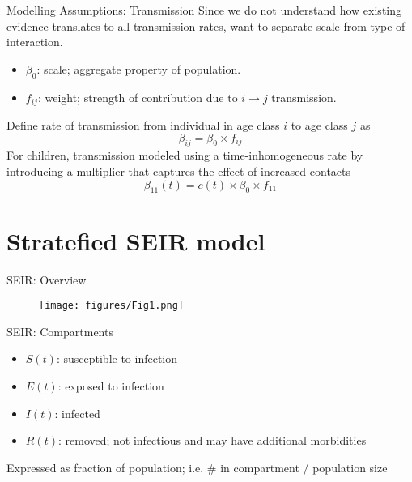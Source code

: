 \documentclass[8pt]{beamer}
\begin{document}
\begin{frame}{Modelling Assumptions: Transmission}
%
Since we do not understand how existing evidence translates to all transmission rates, want to separate scale from type of interaction.
\begin{itemize}
    \item $\beta_{0}$: scale; aggregate property of population.
    \item $f_{ij}$: weight; strength of contribution due to $i \to j$ transmission.
\end{itemize}
Define rate of transmission from individual in age class $i$ to age class $j$ as
\begin{equation*}
    \beta_{ij} = \beta_{0} \times f_{ij}
\end{equation*}
For children, transmission modeled using a time-inhomogeneous rate by introducing a multiplier that captures the effect of increased contacts
\begin{equation*}
    \beta_{11}(t) = c(t) \times \beta_{0} \times f_{11}
\end{equation*}
\end{frame}

\section{Stratefied SEIR model}

\begin{frame}{SEIR: Overview}
\begin{figure}
    \centering
    \texttt{[image: figures/Fig1.png]}
\end{figure}
\end{frame}

\begin{frame}{SEIR: Compartments}
\begin{itemize}
    \item $S(t)$: susceptible to infection
    \item $E(t)$: exposed to infection
    \item $I(t)$: infected
    \item $R(t)$: removed; not infectious and may have additional morbidities
\end{itemize}

Expressed as fraction of population; i.e. \# in compartment / population size
\end{frame}
\end{document}
